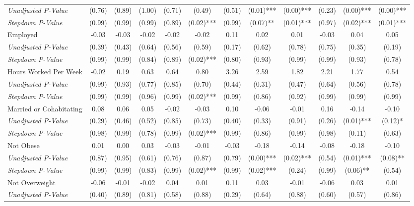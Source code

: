 \begin{tabular}{l c c c c c c c c c c c}
\quad \textit{Unadjusted P-Value} & (0.76) & (0.89) & (1.00) & (0.71) & (0.49) & (0.51) & (0.01)*** & (0.00)*** & (0.23) & (0.00)*** & (0.00)*** \\
\quad \textit{Stepdown P-Value} & (0.99) & (0.99) & (0.99) & (0.89) & (0.02)*** & (0.99) & (0.07)** & (0.01)*** & (0.97) & (0.02)*** & (0.01)*** \\
Employed & -0.03 & -0.03 & -0.02 & -0.02 & -0.02 & 0.11 & 0.02 & 0.01 & -0.03 & 0.04 & 0.05 \\
\quad \textit{Unadjusted P-Value} & (0.39) & (0.43) & (0.64) & (0.56) & (0.59) & (0.17) & (0.62) & (0.78) & (0.75) & (0.35) & (0.19) \\
\quad \textit{Stepdown P-Value} & (0.99) & (0.99) & (0.84) & (0.89) & (0.02)*** & (0.80) & (0.93) & (0.99) & (0.99) & (0.93) & (0.78) \\
Hours Worked Per Week & -0.02 & 0.19 & 0.63 & 0.64 & 0.80 & 3.26 & 2.59 & 1.82 & 2.21 & 1.77 & 0.54 \\
\quad \textit{Unadjusted P-Value} & (0.99) & (0.93) & (0.77) & (0.85) & (0.70) & (0.44) & (0.31) & (0.47) & (0.64) & (0.56) & (0.78) \\
\quad \textit{Stepdown P-Value} & (0.99) & (0.99) & (0.96) & (0.99) & (0.02)*** & (0.99) & (0.86) & (0.92) & (0.99) & (0.99) & (0.99) \\
Married or Cohabitating & 0.08 & 0.06 & 0.05 & -0.02 & -0.03 & 0.10 & -0.06 & -0.01 & 0.16 & -0.14 & -0.10 \\
\quad \textit{Unadjusted P-Value} & (0.29) & (0.46) & (0.52) & (0.85) & (0.73) & (0.40) & (0.33) & (0.91) & (0.26) & (0.01)*** & (0.12)* \\
\quad \textit{Stepdown P-Value} & (0.98) & (0.99) & (0.78) & (0.99) & (0.02)*** & (0.99) & (0.86) & (0.99) & (0.98) & (0.11) & (0.63) \\
Not Obese & 0.01 & 0.00 & 0.03 & -0.03 & -0.01 & -0.03 & -0.18 & -0.14 & -0.08 & -0.18 & -0.10 \\
\quad \textit{Unadjusted P-Value} & (0.87) & (0.95) & (0.61) & (0.76) & (0.87) & (0.79) & (0.00)*** & (0.02)*** & (0.54) & (0.01)*** & (0.08)** \\
\quad \textit{Stepdown P-Value} & (0.99) & (0.99) & (0.83) & (0.99) & (0.02)*** & (0.99) & (0.02)*** & (0.24) & (0.99) & (0.06)** & (0.54) \\
Not Overweight & -0.06 & -0.01 & -0.02 & 0.04 & 0.01 & 0.11 & 0.03 & -0.01 & -0.06 & 0.03 & 0.01 \\
\quad \textit{Unadjusted P-Value} & (0.40) & (0.89) & (0.81) & (0.58) & (0.88) & (0.29) & (0.64) & (0.88) & (0.60) & (0.57) & (0.86) \\

\end{tabular}
